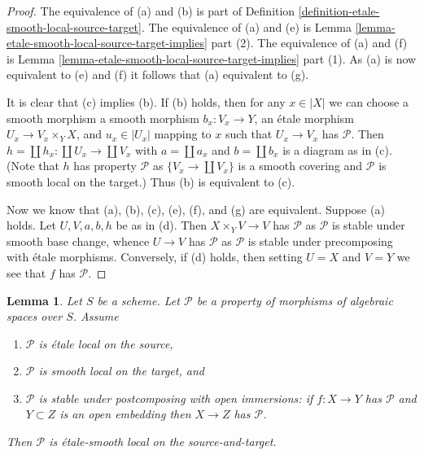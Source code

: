 \documentclass{stacks-project}
\theoremstyle{plain}
\newtheorem{lemma}[subsection]{Lemma}
\theoremstyle{definition}
\theoremstyle{remark}
\numberwithin{equation}{subsection}
\begin{document}
\begin{proof}
The equivalence of (a) and (b) is part of
Definition \ref{definition-etale-smooth-local-source-target}.
The equivalence of (a) and (e) is
Lemma \ref{lemma-etale-smooth-local-source-target-implies} part (2).
The equivalence of (a) and (f) is
Lemma \ref{lemma-etale-smooth-local-source-target-implies} part (1).
As (a) is now equivalent to (e) and (f) it follows that
(a) equivalent to (g).

\medskip\noindent
It is clear that (c) implies (b). If (b) holds, then for any
$x \in |X|$ we can choose a smooth morphism a smooth morphism
$b_x : V_x \to Y$, an \'etale morphism $U_x \to V_x \times_Y X$,
and $u_x \in |U_x|$ mapping to $x$
such that $U_x \to V_x$ has $\mathcal{P}$.
Then $h = \coprod h_x : \coprod U_x \to \coprod V_x$
with $a = \coprod a_x$ and $b = \coprod b_x$ is a diagram as in (c).
(Note that $h$ has property $\mathcal{P}$ as $\{V_x \to \coprod V_x\}$
is a smooth covering and $\mathcal{P}$ is smooth local on the target.)
Thus (b) is equivalent to (c).

\medskip\noindent
Now we know that (a), (b), (c), (e), (f), and (g) are equivalent.
Suppose (a) holds. Let $U, V, a, b, h$ be as in (d). Then
$X \times_Y V \to V$ has $\mathcal{P}$ as $\mathcal{P}$ is stable under
smooth base change, whence $U \to V$ has $\mathcal{P}$ as $\mathcal{P}$
is stable under precomposing with \'etale morphisms. Conversely, if (d)
holds, then setting $U = X$ and $V = Y$ we see that $f$ has $\mathcal{P}$.
\end{proof}

\begin{lemma}
\label{lemma-etale-smooth-local-source-target}
Let $S$ be a scheme.
Let $\mathcal{P}$ be a property of morphisms of algebraic spaces over $S$.
Assume
\begin{enumerate}
\item $\mathcal{P}$ is \'etale local on the source,
\item $\mathcal{P}$ is smooth local on the target, and
\item $\mathcal{P}$ is stable under postcomposing with open immersions:
if $f : X \to Y$ has $\mathcal{P}$ and $Y \subset Z$ is an open embedding
then $X \to Z$ has $\mathcal{P}$.
\end{enumerate}
Then $\mathcal{P}$ is \'etale-smooth local on the source-and-target.
\end{lemma}
\end{document}
